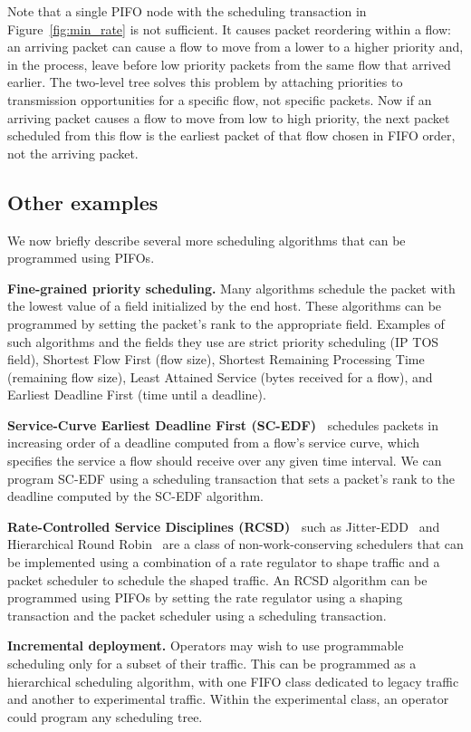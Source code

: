 Note that a single PIFO node with the scheduling transaction in
Figure~\ref{fig:min_rate} is not sufficient. It causes packet
reordering within a flow: an arriving packet can cause a flow to move
from a lower to a higher priority and, in the process, leave before
low priority packets from the same flow that arrived earlier. The
two-level tree solves this problem by attaching priorities to
transmission opportunities for a specific flow, not specific
packets. Now if an arriving packet causes a flow to move from low to
high priority, the next packet scheduled from this flow is the
earliest packet of that flow chosen in FIFO order, not the arriving
packet.

\subsection{Other examples}
\label{ss:other}

We now briefly describe several more scheduling algorithms that can be
programmed using PIFOs.

\begin{CompactEnumerate}
\item \textbf{Fine-grained priority scheduling.} Many algorithms
  schedule the packet with the lowest value of a field initialized by
  the end host. These algorithms can be programmed by setting the
  packet's rank to the appropriate field. Examples of such algorithms
  and the fields they use are strict priority scheduling (IP TOS
  field), Shortest Flow First (flow size), Shortest Remaining
  Processing Time (remaining flow size), Least Attained Service (bytes
  received for a flow), and Earliest Deadline First (time until a
  deadline).
\item \textbf{Service-Curve Earliest Deadline First
    (SC-EDF)~\cite{sced}} schedules packets in increasing order of a
  deadline computed from a flow's service curve, which specifies the
  service a flow should receive over any given time interval. We can
  program SC-EDF using a scheduling transaction that sets a packet's
  rank to the deadline computed by the SC-EDF algorithm.
\item \textbf{Rate-Controlled Service Disciplines (RCSD)~\cite{rcsd}}
  such as Jitter-EDD~\cite{jitteredd} and Hierarchical Round
  Robin~\cite{hrr} are a class of non-work-conserving schedulers
  that can be implemented using a combination of a rate
  regulator to shape traffic and a packet scheduler to schedule the
  shaped traffic. An RCSD algorithm can be programmed using PIFOs by
  setting the rate regulator using a shaping transaction and the
  packet scheduler using a scheduling transaction.
  
\item \textbf{Incremental deployment.}
  Operators may wish to use programmable scheduling only for a
  subset of their traffic. This can be programmed as a hierarchical
  scheduling algorithm, with one FIFO class dedicated to legacy
  traffic and another to experimental traffic. Within the experimental
  class, an operator could program any scheduling tree. %
\end{CompactEnumerate}

